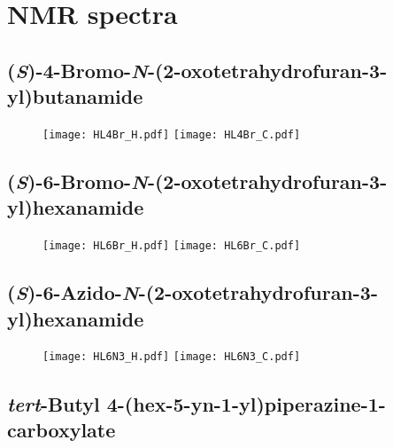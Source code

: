 \section{NMR spectra}

\subsection{(\textit{S})-4-Bromo-\textit{N}-(2-oxotetrahydrofuran-3-yl)butanamide }

\begin{figure}[H]
	\centering
		\texttt{[image: HL4Br\_H.pdf]}
		\texttt{[image: HL4Br\_C.pdf]}
\end{figure}

\subsection{(\textit{S})-6-Bromo-\textit{N}-(2-oxotetrahydrofuran-3-yl)hexanamide }

\begin{figure}[H]
	\centering
		\texttt{[image: HL6Br\_H.pdf]}
		\texttt{[image: HL6Br\_C.pdf]}
\end{figure}

\subsection{(\textit{S})-6-Azido-\textit{N}-(2-oxotetrahydrofuran-3-yl)hexanamide }

\begin{figure}[H]
	\centering
		\texttt{[image: HL6N3\_H.pdf]}
		\texttt{[image: HL6N3\_C.pdf]}
\end{figure}

\subsection{\textit{tert}-Butyl 4-(hex-5-yn-1-yl)piperazine-1-carboxylate }

